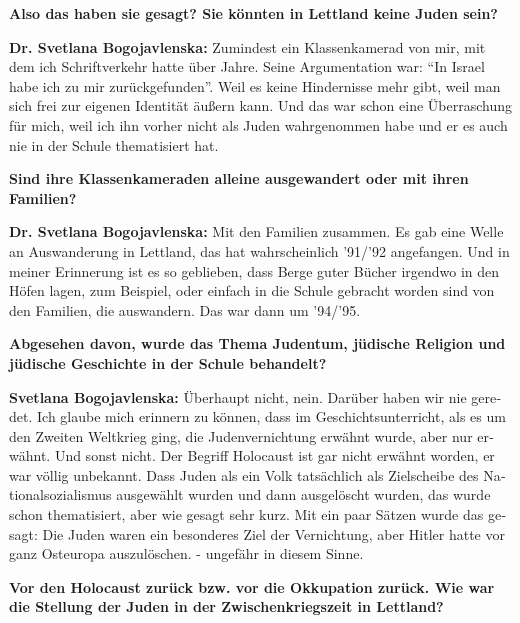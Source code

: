 \begin{otherlanguage}{ngerman}
\textbf{Also das haben sie gesagt? Sie könnten in Lettland keine Juden sein?}

\textbf{Dr. Svetlana Bogojavlenska:} Zumindest ein Klassenkamerad von mir, mit dem ich Schriftverkehr hatte über Jahre. Seine Argumentation war: "`In Israel habe ich zu mir zurückgefunden"'. Weil es keine Hindernisse mehr gibt, weil man sich frei zur eigenen Identität äußern kann. Und das war schon eine Überraschung für mich, weil ich ihn vorher nicht als Juden wahrgenommen habe und er es auch nie in der Schule thematisiert hat.

\textbf{Sind ihre Klassenkameraden alleine ausgewandert oder mit ihren Familien?}

\textbf{Dr. Svetlana Bogojavlenska:} Mit den Familien zusammen. Es gab eine Welle an Auswanderung in Lettland, das hat wahrscheinlich '91/'92 angefangen. Und in meiner Erinnerung ist es so geblieben, dass Berge guter Bücher irgendwo in den Höfen lagen, zum Beispiel, oder einfach in die Schule gebracht worden sind von den Familien, die auswandern.  Das war dann um '94/'95.

\textbf{Abgesehen davon, wurde das Thema Judentum, jüdische Religion und jüdische Geschichte in der Schule behandelt?}

\textbf{Svetlana Bogojavlenska:} Überhaupt nicht, nein. Darüber haben wir nie geredet. Ich glaube mich erinnern zu können, dass im Geschichtsunterricht, als es um den Zweiten Weltkrieg ging, die Judenvernichtung erwähnt wurde, aber nur erwähnt. Und sonst nicht. Der Begriff Holocaust ist gar nicht erwähnt worden, er war völlig unbekannt. Dass Juden als ein Volk tatsächlich als Zielscheibe des Nationalsozialismus ausgewählt wurden und dann ausgelöscht wurden, das wurde schon thematisiert, aber wie gesagt sehr kurz. Mit ein paar Sätzen wurde das gesagt: Die Juden waren ein besonderes Ziel der Vernichtung, aber Hitler hatte vor ganz Osteuropa auszulöschen. - ungefähr in diesem Sinne.

\textbf{Vor den Holocaust zurück bzw. vor die Okkupation zurück. Wie war die Stellung der Juden in der Zwischenkriegszeit in Lettland?}


\end{otherlanguage}
